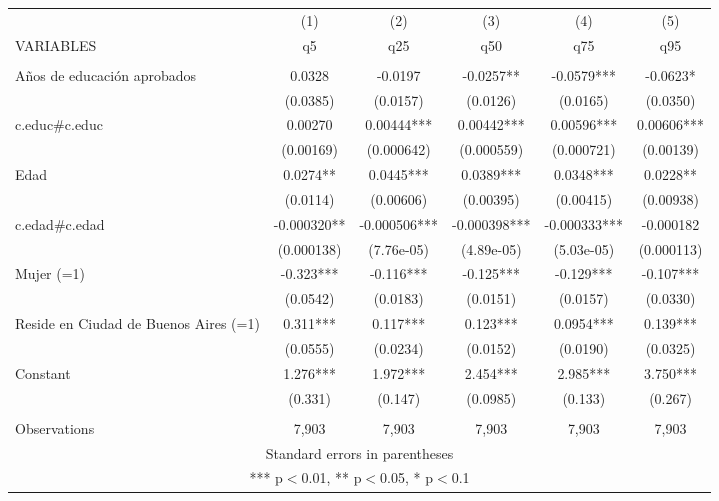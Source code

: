 \documentclass[]{article}
\begin{document}
\begin{tabular}{lccccc} \hline
 & (1) & (2) & (3) & (4) & (5) \\
VARIABLES & q5 & q25 & q50 & q75 & q95 \\ \hline
 &  &  &  &  &  \\
Años de educación aprobados & 0.0328 & -0.0197 & -0.0257** & -0.0579*** & -0.0623* \\
 & (0.0385) & (0.0157) & (0.0126) & (0.0165) & (0.0350) \\
c.educ\#c.educ & 0.00270 & 0.00444*** & 0.00442*** & 0.00596*** & 0.00606*** \\
 & (0.00169) & (0.000642) & (0.000559) & (0.000721) & (0.00139) \\
Edad & 0.0274** & 0.0445*** & 0.0389*** & 0.0348*** & 0.0228** \\
 & (0.0114) & (0.00606) & (0.00395) & (0.00415) & (0.00938) \\
c.edad\#c.edad & -0.000320** & -0.000506*** & -0.000398*** & -0.000333*** & -0.000182 \\
 & (0.000138) & (7.76e-05) & (4.89e-05) & (5.03e-05) & (0.000113) \\
Mujer (=1) & -0.323*** & -0.116*** & -0.125*** & -0.129*** & -0.107*** \\
 & (0.0542) & (0.0183) & (0.0151) & (0.0157) & (0.0330) \\
Reside en Ciudad de Buenos Aires (=1) & 0.311*** & 0.117*** & 0.123*** & 0.0954*** & 0.139*** \\
 & (0.0555) & (0.0234) & (0.0152) & (0.0190) & (0.0325) \\
Constant & 1.276*** & 1.972*** & 2.454*** & 2.985*** & 3.750*** \\
 & (0.331) & (0.147) & (0.0985) & (0.133) & (0.267) \\
 &  &  &  &  &  \\
 Observations & 7,903 & 7,903 & 7,903 & 7,903 & 7,903 \\ \hline
\multicolumn{6}{c}{ Standard errors in parentheses} \\
\multicolumn{6}{c}{ *** p$<$0.01, ** p$<$0.05, * p$<$0.1} \\
\end{tabular}
\end{document}
